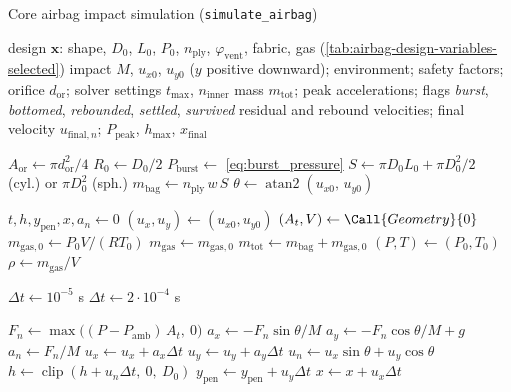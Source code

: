 
\begin{algobox}[label=alg:simulate_airbag]{Core airbag impact simulation (\texttt{simulate\_airbag})}
\begin{algorithmic}[1]
\Require design $\mathbf{x}$: shape, $D_0$, $L_0$, $P_0$, $n_\text{ply}$, $\varphi_\text{vent}$, fabric, gas (\cref{tab:airbag-design-variables-selected})
\Cont impact $M$, $u_{x0}$, $u_{y0}$ ($y$ positive downward); environment; safety factors; orifice $d_\text{or}$; solver settings $t_\text{max}$, $n_\text{inner}$
\Ensure mass $m_\text{tot}$; peak accelerations; flags \textit{burst}, \textit{bottomed}, \textit{rebounded}, \textit{settled}, \textit{survived}
\Cont residual and rebound velocities; final velocity $u_{\text{final},n}$; $P_\text{peak}$, $h_\text{max}$, $x_\text{final}$

\State $A_\text{or} \gets \pi d_\text{or}^2/4$
\State $R_0 \gets D_0/2$
\State $P_\text{burst} \gets$ \cref{eq:burst_pressure} 
\State $S \gets \pi D_0 L_0 + \pi D_0^2/2$ (cyl.) or $\pi D_0^2$ (sph.) 
\State $m_\text{bag} \gets n_\text{ply}\,w\,S$
\State $\theta \gets \operatorname{atan2}(u_{x0},\,u_{y0})$ 

\State $t, h, y_\text{pen}, x, a_n \gets 0$
\State $(u_x, u_y) \gets (u_{x0}, u_{y0})$
\State $(A_t, V) \gets \Call{Geometry}{0}$
\State $m_{\text{gas},0} \gets P_0 V/(R T_0)$ 
\State $m_\text{gas} \gets m_{\text{gas},0}$
\State $m_\text{tot} \gets m_\text{bag} + m_{\text{gas},0}$ 
\State $(P, T) \gets (P_0, T_0)$
\State $\rho \gets m_\text{gas}/V$

    \State $\Delta t \gets 10^{-5}$ s
    \State $\Delta t \gets 2\cdot 10^{-4}$ s
  \EndIf {}

  \State $F_n \gets \max\big((P - P_\text{amb})\,A_t,\ 0\big)$ 
  \State $a_x \gets -F_n\sin\theta/M$
  \State $a_y \gets -F_n\cos\theta/M + g$
  \State $a_n \gets F_n/M$
  \State $u_x \gets u_x + a_x\Delta t$
  \State $u_y \gets u_y + a_y\Delta t$
  \State $u_n \gets u_x\sin\theta + u_y\cos\theta$
  \State $h \gets \operatorname{clip}(h + u_n\Delta t,\ 0,\ D_0)$ 
  \State $y_\text{pen} \gets y_\text{pen} + u_y\Delta t$ 
  \State $x \gets x + u_x\Delta t$


\end{algorithmic}
\end{algobox}
